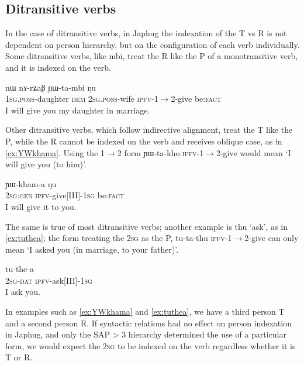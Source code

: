 \documentclass[oldfontcommands,oneside,a4paper,11pt]{article}
\newcommand{\ipa}[1]{{\phon \mbox{#1}}} %
\begin{document}
\subsection{Ditransitive verbs}
In the case of ditransitive verbs, in Japhug the indexation of the T vs R is not dependent on person hierarchy, but on the configuration of each verb individually. Some ditransitive verbs, like \ipa{mbi}, treat the R like the P of a monotransitive verb, and it is indexed on the verb.

\begin{exe}
\ex \label{ex:YWtambi}
\gll \ipa{a-me} 	\ipa{nɯ} 	\ipa{nɤ-rʑaβ} 	\ipa{ɲɯ-ta-mbi} 	\ipa{ŋu} \\
\textsc{1sg.poss}-daughter \textsc{dem} \textsc{2sg.poss}-wife \textsc{ipfv}-1$\rightarrow$2-give be:\textsc{fact} \\
\glt I will give you my daughter in marriage.
\end{exe}

Other ditransitive verbs, which follow indirective alignment, treat the T like the P, while the R cannot be indexed on the verb and receives oblique case, as in \ref{ex:YWkhama}. Using the 1$\rightarrow$2 form \ipa{ɲɯ-ta-kho} \textsc{ipfv}-1$\rightarrow$2-give would mean `I will give you (to him)'.

\begin{exe}
\ex \label{ex:YWkhama}
\gll \ipa{nɤʑɯɣ} 	\ipa{ɲɯ-kham-a} \ipa{ŋu} \\
\textsc{2sg:gen} \textsc{ipfv}-give[III]-\textsc{1sg} be:\textsc{fact} \\
\glt I will give it to you.
\end{exe}

The same is true of most ditransitive verbs; another example is \ipa{thu} `ask', as in \ref{ex:tuthea}; the form treating the \textsc{2sg} as the P, \ipa{tu-ta-thu} \textsc{ipfv}-1$\rightarrow$2-give can only mean `I asked you (in marriage, to your father)'.

\begin{exe}
\ex \label{ex:tuthea}
\gll \ipa{nɤ-ɕki} 	\ipa{tu-the-a} \\
\textsc{2sg-dat} \textsc{ipfv}-ask[III]-\textsc{1sg} \\
\glt I ask you.
\end{exe}

In examples such as \ref{ex:YWkhama} and \ref{ex:tuthea}, we have a third person T and a second person R. If syntactic relations had no effect on person indexation in Japhug, and only the SAP > 3 hierarchy determined the use of a particular form, we would expect the \textsc{2sg} to be indexed on the verb regardless whether it is T or R.
\end{document}
